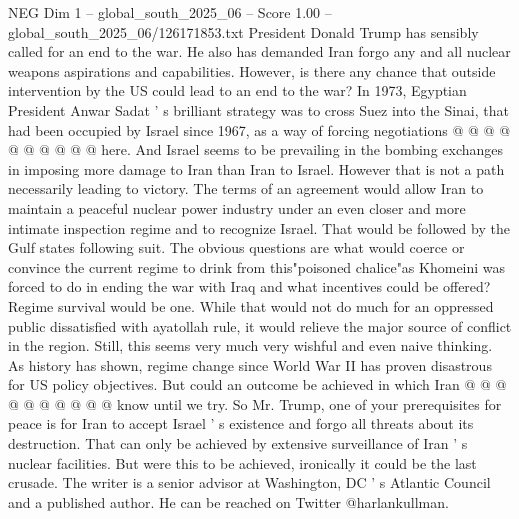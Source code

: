 \begin{textsample}{NEG Dim 1 – global\_south\_2025\_06 – Score 1.00 – global\_south\_2025\_06/126171853.txt}
President Donald Trump has sensibly called for an end to the war.
He also has demanded Iran forgo any and all nuclear weapons aspirations and capabilities.
However, is there any chance that outside intervention by the US could lead to an end to the war?
In 1973, Egyptian President Anwar Sadat ' s brilliant strategy was to cross Suez into the Sinai, that had been occupied by Israel since 1967, as a way of forcing negotiations @ @ @ @ @ @ @ @ @ @ here.
And Israel seems to be prevailing in the bombing exchanges in imposing more damage to Iran than Iran to Israel.
However that is not a path necessarily leading to victory.
The terms of an agreement would allow Iran to maintain a peaceful nuclear power industry under an even closer and more intimate inspection regime and to recognize Israel.
That would be followed by the Gulf states following suit.
The obvious questions are what would coerce or convince the current regime to drink from this"poisoned chalice"as Khomeini was forced to do in ending the war with Iraq and what incentives could be offered?
Regime survival would be one.
While that would not do much for an oppressed public dissatisfied with ayatollah rule, it would relieve the major source of conflict in the region.
Still, this seems very much very wishful and even naive thinking.
As history has shown, regime change since World War II has proven disastrous for US policy objectives.
But could an outcome be achieved in which Iran @ @ @ @ @ @ @ @ @ @ know until we try.
So Mr.
Trump, one of your prerequisites for peace is for Iran to accept Israel ' s existence and forgo all threats about its destruction.
That can only be achieved by extensive surveillance of Iran ' s nuclear facilities.
But were this to be achieved, ironically it could be the last crusade.
The writer is a senior advisor at Washington, DC ' s Atlantic Council and a published author.
He can be reached on Twitter @harlankullman.

\end{textsample}
